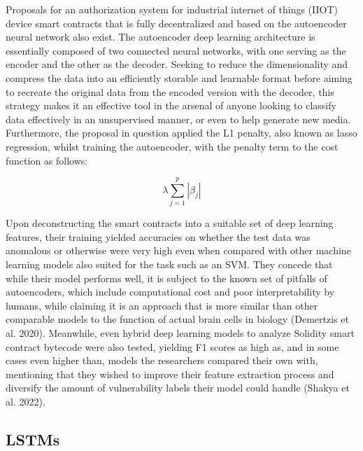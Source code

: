 \documentclass[
  11pt,
]{article}
\begin{document}
Proposals for an authorization system for industrial internet of things
(IIOT) device smart contracts that is fully decentralized and based on
the autoencoder neural network also exist. The autoencoder deep learning
architecture is essentially composed of two connected neural networks,
with one serving as the encoder and the other as the decoder. Seeking to
reduce the dimensionality and compress the data into an efficiently
storable and learnable format before aiming to recreate the original
data from the encoded version with the decoder, this strategy makes it
an effective tool in the arsenal of anyone looking to classify data
effectively in an unsupervised manner, or even to help generate new
media. Furthermore, the proposal in question applied the L1 penalty,
also known as lasso regression, whilst training the autoencoder, with
the penalty term to the cost function as follows:

\[\lambda \sum_{j=1}^p |\beta_j|\]

Upon deconstructing the smart contracts into a suitable set of deep
learning features, their training yielded accuracies on whether the test
data was anomalous or otherwise were very high even when compared with
other machine learning models also suited for the task such as an SVM.
They concede that while their model performs well, it is subject to the
known set of pitfalls of autoencoders, which include computational cost
and poor interpretability by humans, while claiming it is an approach
that is more similar than other comparable models to the function of
actual brain cells in biology (Demertzis et al. 2020). Meanwhile, even
hybrid deep learning models to analyze Solidity smart contract bytecode
were also tested, yielding F1 scores as high as, and in some cases even
higher than, models the researchers compared their own with, mentioning
that they wished to improve their feature extraction process and
diversify the amount of vulnerability labels their model could handle
(Shakya et al. 2022).

\hypertarget{lstms}{%
\subsection{LSTMs}\label{lstms}}
\end{document}
